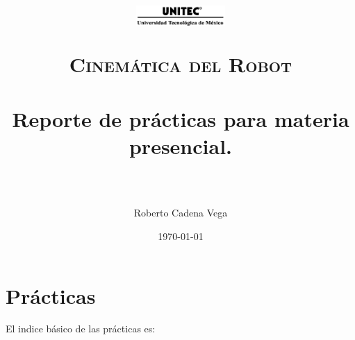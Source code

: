 



\title{
	\normalfont \normalsize
	\begin{figure}[h]
		\begin{center}
			\includegraphics[width=0.3\textwidth]{../images/UNITEC.png}
		\end{center}
	\end{figure}
	\textsc{Cinemática del Robot} \\ [25pt]
	\horrule{0.5pt} \\[0.4cm] %
	\huge Reporte de prácticas para materia presencial. \\ %
	\horrule{2pt} \\[0.5cm] %
}

\author{Roberto Cadena Vega} %

\date{\normalsize \today} %




\maketitle %


\section{Prácticas}

	El indice básico de las prácticas es:

